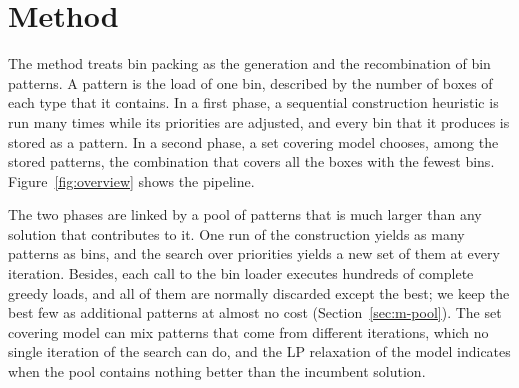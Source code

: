 \providecommand{\cfgfast}{\textsc{Fast}}
\providecommand{\cfgbal}{\textsc{Balanced}}
\providecommand{\cfgqual}{\textsc{Quality}}
\section{Method}
\label{sec:method}

The method treats bin packing as the generation and the recombination of bin patterns. A
pattern is the load of one bin, described by the number of boxes of each type that it contains.
In a first phase, a sequential construction heuristic is run many times while its priorities
are adjusted, and every bin that it produces is stored as a pattern. In a second phase, a set
covering model chooses, among the stored patterns, the combination that covers all the boxes
with the fewest bins. Figure~\ref{fig:overview} shows the pipeline.

The two phases are linked by a pool of patterns that is much larger than any solution that
contributes to it. One run of the construction yields as many patterns as bins, and the search
over priorities yields a new set of them at every iteration. Besides, each call to the bin
loader executes hundreds of complete greedy loads, and all of them are normally discarded except
the best; we keep the best few as additional patterns at almost no cost (Section~\ref{sec:m-pool}).
The set covering model can mix patterns that come from different iterations, which no single
iteration of the search can do, and the LP relaxation of the model indicates when the pool
contains nothing better than the incumbent solution.

